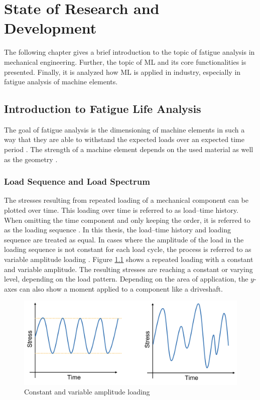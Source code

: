 \chapter{State of Research and Development}\label{chap2}
The following chapter gives a brief introduction to the topic of fatigue analysis in mechanical engineering. Further, the topic of ML and its core functionalities is presented. Finally, it is analyzed how ML is applied in industry, especially in fatigue analysis of machine elements.

\section{Introduction to Fatigue Life Analysis}
The goal of fatigue analysis is the dimensioning of machine elements in such a way that they are able to withstand the expected loads over an expected time period \cite{Haibach}. The strength of a machine element depends on the used material as well as the geometry \cite{Wittel}.

\subsection{Load Sequence and Load Spectrum}
The stresses resulting from repeated loading of a mechanical component can be plotted over time. This loading over time is referred to as load–time history. When omitting the time component and only keeping the order, it is referred to as the loading sequence \cite{HEULER}. In this thesis, the load–time history and loading sequence are treated as equal. In cases where the amplitude of the load in the loading sequence is not constant for each load cycle, the process is referred to as variable amplitude loading \cite{Facchinetti}.
Figure \ref{fig:VAL} shows a repeated loading with a constant and variable amplitude.
The resulting stresses are reaching a constant or varying level, depending on the load pattern. Depending on the area of application, the \(y\)-axes can also show a moment applied to a component like a driveshaft.

\begin{figure}[H]
	\centering
	\includegraphics[width=0.85\linewidth]{IMGs/loading.png}
	\caption{Constant and variable amplitude loading}
	\label{fig:VAL}
\end{figure}
 
